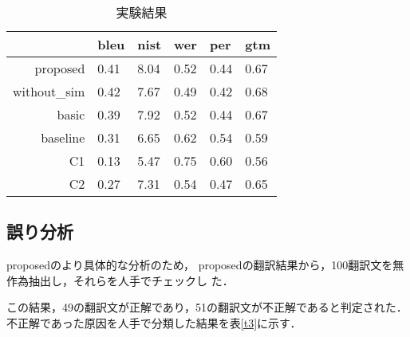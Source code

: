 	
	\begin{table}
	\caption{実験結果}
	\begin{center}
	\label{t1}
	\begin{tabular}{rlllll}
	\hline
	                        & bleu & nist & wer  & per  & gtm \\
	\hline
	{\sc proposed}           & 0.41 & 8.04 & 0.52 & 0.44 & 0.67 \\
	{\sc without\_sim}       & 0.42 & 7.67 & 0.49 & 0.42 &0.68 \\
	{\sc basic}              & 0.39 & 7.92 & 0.52 & 0.44 & 0.67 \\
	{\sc baseline}           & 0.31 & 6.65 & 0.62 & 0.54 & 0.59 \\
	{\sc C1}                 & 0.13 & 5.47 & 0.75 & 0.60 & 0.56 \\
	{\sc C2}                 & 0.27 & 7.31 & 0.54 & 0.47 & 0.65 \\
	\hline
	\end{tabular}
	\end{center}
	\end{table}
	
	
	

\subsection{誤り分析}

{\sc proposed}のより具体的な分析のため，
{\sc proposed}の翻訳結果から，100翻訳文を無作為抽出し，それらを人手でチェックし
た．

この結果，49の翻訳文が正解であり，51の翻訳文が不正解であると判定された．
不正解であった原因を人手で分類した結果を表\ref{t3}に示す．

